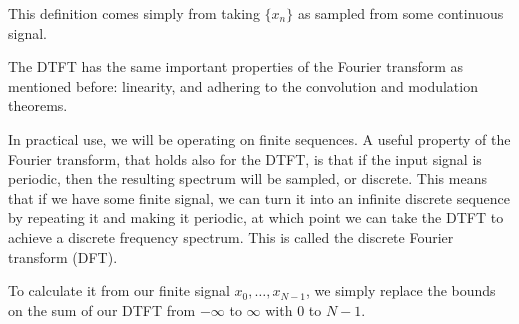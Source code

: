 \documentclass[12pt]{article}
\begin{document}
This definition comes simply from taking $\{x_n\}$ as sampled from some continuous signal.

The DTFT has the same important properties of the Fourier transform as mentioned before: linearity, and adhering to the convolution and modulation theorems.

In practical use, we will be operating on finite sequences. A useful property of the Fourier transform, that holds also for the DTFT, is that if the input signal is periodic, then the resulting spectrum will be sampled, or discrete. This means that if we have some finite signal, we can turn it into an infinite discrete sequence by repeating it and making it periodic, at which point we can take the DTFT to achieve a discrete frequency spectrum. This is called the discrete Fourier transform (DFT).

To calculate it from our finite signal $x_0, \ldots, x_{N-1}$, we simply replace the bounds on the sum of our DTFT from $-\infty$ to $\infty$ with $0$ to $N-1$.
\end{document}
